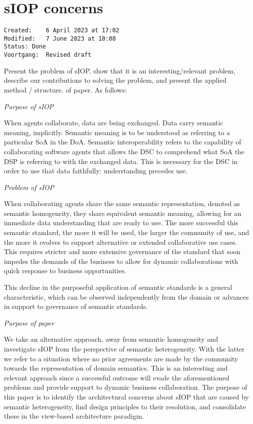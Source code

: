 \documentclass[sort&compress,preprint,3p,authoryear,twocolumn]{elsarticle}
\theoremstyle{break}			%
\begin{document}

\section{sIOP concerns}\label{siop-concerns}

\begin{verbatim}
Created:    6 April 2023 at 17:02
Modified:   7 June 2023 at 10:08
Status: Done
Voortgang:  Revised draft
\end{verbatim}

Present the problem of sIOP, show that it is an interesting/relevant
problem, describe our contributions to solving the problem, and present
the applied method / structure. of paper. As follows:

\emph{Purpose of sIOP}

When agents collaborate, data are being exchanged. Data carry semantic
meaning, implicitly. Semantic meaning is to be understood as referring
to a particular SoA in the DoA. Semantic interoperability refers to the
capability of collaborating software agents that allows the DSC to
comprehend what SoA the DSP is referring to with the exchanged data.
This is necessary for the DSC in order to use that data faithfully:
understanding precedes use.

\emph{Problem of sIOP}

When collaborating agents share the same semantic representation,
denoted as semantic homogeneity, they share equivalent semantic meaning,
allowing for an immediate data understanding that are ready to use. The
more successful this semantic standard, the more it will be used, the
larger the community of use, and the more it evolves to support
alternative or extended collaborative use cases. This requires stricter
and more extensive governance of the standard that soon impedes the
demands of the business to allow for dynamic collaborations with quick
response to business opportunities.

This decline in the purposeful application of semantic standards is a
general characteristic, which can be observed independently from the
domain or advances in support to governance of semantic standards.

\emph{Purpose of paper}

We take an alternative approach, away from semantic homogeneity and
investigate sIOP from the perspective of semantic heterogeneity. With
the latter we refer to a situation where no prior agreements are made by
the community towards the representation of domain semantics. This is an
interesting and relevant approach since a successful outcome will evade
the aforementioned problems and provide support to dynamic business
collaboration. The purpose of this paper is to identify the
architectural concerns about sIOP that are caused by semantic
heterogeneity, find design principles to their resolution, and
consolidate these in the view-based architecture paradigm.
\end{document}
